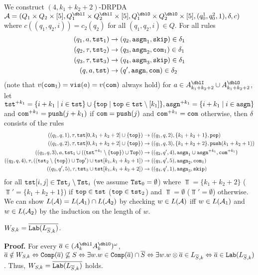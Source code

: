 We construct $(4,k_1+k_2+2)$-DRPDA
$\calA=(Q_1\times Q_2\times[5], Q^\dblI_1\times Q^\dblI_2\times[5], Q^\dblO_1\times Q^\dblO_2\times[5], (q^1_0, q^2_0, 1), \delta, c)$
where $c((q_1,q_2,i))=c_2(q_2)$ for all $(q_1,q_2,i)\in Q$.
For all rules
\begin{align}
(q_1, a, \mathtt{tst}_1) &\to (q_2,\mathtt{asgn}_1, \mathtt{skip})\in\delta_1\label{eq: LkS1}\\
(q_2, \tau, \mathtt{tst}_2) &\to (q_3,\mathtt{asgn}_2, \mathtt{com}_1)\in\delta_1\label{eq: LkS2}\\
(q_3, \tau, \mathtt{tst}_3) &\to (q_4,\mathtt{asgn}_3, \mathtt{skip})\in\delta_1\label{eq: LkS3}\\
(q, a, \mathtt{tst}) &\to (q',\mathtt{asgn}, \mathtt{com})\in\delta_2\label{eq: LkS4}
\end{align}
(note that $v(\mathtt{com}_1)=\mathtt{vis}(a)=v(\mathtt{com})$ always hold) for $a\in A^\dblI_{k_1+k_2+2}\cup A^\dblO_{k_1+k_2+2}$,
let $\mathtt{tst}^{+ k_1}=\{i+k_1\mid i\in\mathtt{tst}\}\cup\{\mathtt{top}\mid\mathtt{top}\in\mathtt{tst}\setminus[k_1]\}, \mathtt{asgn}^{+ k_1}=\{i+k_1\mid i\in\mathtt{asgn}\}$ and $\mathtt{com}^{+ k_1} = \mathtt{push}(j+k_1)$ if $\mathtt{com}=\mathtt{push}(j)$ and $\mathtt{com}^{+ k_1} = \mathtt{com}$ otherwise, then $\delta$ consists of the rules
\begin{align}
((q_1, q, 1), \tau, \mathtt{tst}[0,k_1+k_2+2]\cup\{\mathtt{top}\}) &\to ((q_1, q, 2), \{k_1+k_2+1\}, \mathtt{pop})\label{eq: LkS5}\\
((q_1, q, 2), \tau, \mathtt{tst}[0,k_1+k_2+2]\cup\{\mathtt{top}\}) &\to ((q_1, q, 3), \{k_1+k_2+2\}, \mathtt{push}(k_1+k_2+1)) \label{eq: LkS6}\\
((q_1, q, 3), a,
\mathtt{tst}_1\cup ((\mathtt{tst}^{+ k_1}\setminus\{\mathtt{top}\})\cup\mathtt{Top}))
 &\to ((q_2, q', 4), \mathtt{asgn}_1\cup\mathtt{asgn}^{+ k_1}, \mathtt{com}^{+ k_1})\label{eq: LkS7}\\
((q_2, q, 4), \tau,((\mathtt{tst}_2\setminus\{\mathtt{top}\})\cup\mathtt{Top}')\cup\mathtt{tst}[k_1,k_1+k_2+1])
&\to ((q_3, q', 5), \mathtt{asgn}_2, \mathtt{com}_1)\label{eq: LkS8}\\
((q_3, q', 5), \tau, \mathtt{tst}_3\cup\mathtt{tst}[k_1,k_1+k_2+2]) &\to ((q_4, q', 1), \mathtt{asgn}_3, \mathtt{skip})\label{eq: LkS9}
\end{align}
for all $\mathtt{tst}[i,j]\in\mathtt{Tst}_{j}\setminus\mathtt{Tst}_{i}$ (we assume $\mathtt{Tst}_0=\emptyset$) where
$\Top=\{k_1+k_2+2\}$ ($\Top'=\{k_1+k_2+1\}$) if $\mathtt{top}\in\mathtt{tst}$ ($\mathtt{top}\in\mathtt{tst}_2$) and $\Top=\emptyset$ ($\Top'=\emptyset$) otherwise.
We can show $L({\cal A})=L({\cal A}_1)\cap L({\cal A}_2)$
by checking $w\in L({\cal A})$ iff $w\in L({\cal A}_1)$ and $w\in L({\cal A}_2)$ by the induction on the length of $w$.

\begin{lemma}  \label{lem: W=lab}
$W_{S,k} = \overline{\mathtt{Lab}(L_{{\overline{S}},k})}$.
\end{lemma}
{\bf Proof.}\quad
For every $\overa\in(A_k^\dblI A_k^\dblO)^\omega$,
${\overline{a}}\notin W_{S,k} \Leftrightarrow {\mathtt{Comp}}({\overline{a}})\not\subseteq S
\Leftrightarrow \exists w. w\in {\mathtt{Comp}}({\overline{a}})\cap {\overline{S}}
\Leftrightarrow \exists w. w\otimes{\overline{a}}\in L_{{\overline{S}},k}
\Leftrightarrow {\overline{a}}\in\mathtt{Lab}(L_{{\overline{S}},k})$.
Thus, $W_{S,k} = \overline{\mathtt{Lab}(L_{{\overline{S}},k})}$ holds.

